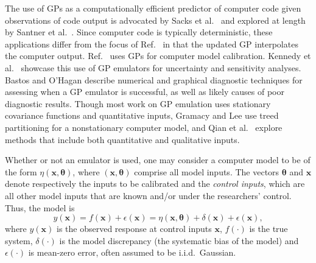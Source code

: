\documentclass[twocolumn,10pt]{asme2ej}
\begin{document}
%
The use of GPs as a computationally efficient predictor of computer code given observations of code output is advocated by Sacks et al.\ \cite{Sacks1989} and explored at length by Santner et al.\ \cite{Santner2003a}.
%
Since computer code is typically deterministic, these applications differ from the focus of Ref.\ \cite{OHagan1978} in that the updated GP interpolates the computer output. 
%
Ref.\ \cite{Kennedy2001} uses GPs for computer model calibration. 
%
Kennedy et al.\ \cite{Kennedy2006} showcase this use of GP emulators for uncertainty and sensitivity analyses. 
%
Bastos and O'Hagan \cite{Bastos2009} describe numerical and graphical diagnostic techniques for assessing when a GP emulator is successful, as well as likely causes of poor diagnostic results. 
%
Though most work on GP emulation uses stationary covariance functions 
and quantitative inputs, 
%
Gramacy and Lee \cite{Gramacy2008} use treed partitioning for a nonstationary computer model, and
%
Qian et al.\ \cite{Qian2008} explore methods that include both quantitative and qualitative inputs.
%

%
Whether or not an emulator is used, one may consider a computer model to be of the form $\eta(\mathbf x,\boldsymbol \theta)$, where $(\mathbf x,\boldsymbol \theta)$ comprise all model inputs. 
%
The vectors $\boldsymbol \theta$ and $\mathbf x$ denote respectively the inputs to be calibrated and the \emph{control inputs}, which are all other model inputs that are known and/or under the researchers' control. 
%
%
%
Thus, the model is
%
\begin{equation} \label{eq:model_gen}
y(\mathbf x)=f(\mathbf x)+\epsilon(\mathbf x) = \eta(\mathbf x,\boldsymbol \theta) + \delta(\mathbf x)+\epsilon(\mathbf x),
\end{equation} 
%
where $y(\mathbf x)$ is the observed response at control inputs $\mathbf x$, $f(\cdot)$ is the true system, $\delta(\cdot)$ is the model discrepancy (the systematic bias of the model) and $\epsilon(\cdot)$ is mean-zero error, often assumed to be i.i.d.\ Gaussian. 
%
\end{document}
